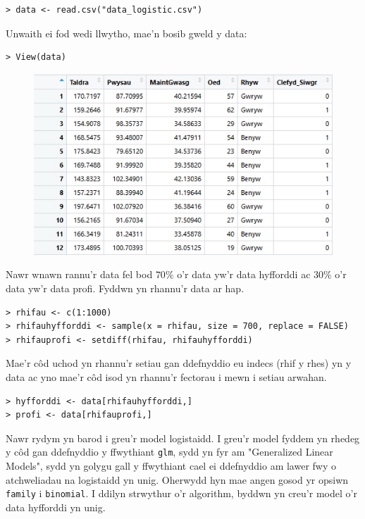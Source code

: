 \begin{verbatim}
> data <- read.csv("data_logistic.csv")
\end{verbatim}

Unwaith ei fod wedi llwytho, mae'n bosib gweld y data:

\begin{verbatim}
> View(data)
\end{verbatim}

\begin{figure}[H]
\begin{center}
\includegraphics[width=0.5\linewidth]{../img/data_diabetes_r.jpg}
\end{center}
\end{figure}

Nawr wnawn rannu'r data fel bod $70\%$ o'r data yw'r data hyfforddi ac $30\%$ o'r data yw'r data profi. Fyddwn yn rhannu'r data ar hap. 

\begin{verbatim}
> rhifau <- c(1:1000)
> rhifauhyfforddi <- sample(x = rhifau, size = 700, replace = FALSE)
> rhifauprofi <- setdiff(rhifau, rhifauhyfforddi)
\end{verbatim}

Mae'r c\^{o}d uchod yn rhannu'r setiau gan ddefnyddio eu indecs (rhif y rhes) yn y data ac yno mae'r c\^{o}d isod yn rhannu'r fectorau i mewn i setiau arwahan. 

\begin{verbatim}
> hyfforddi <- data[rhifauhyfforddi,] 
> profi <- data[rhifauprofi,]
\end{verbatim}

Nawr rydym yn barod i greu'r model logistaidd. I greu'r model fyddem yn rhedeg y c\^{o}d gan ddefnyddio y ffwythiant \texttt{glm}, sydd yn fyr am "Generalized Linear Models", sydd yn golygu gall y ffwythiant cael ei ddefnyddio am lawer fwy o atchweliadau na logistaidd yn unig. Oherwydd hyn mae angen gosod yr opsiwn \texttt{family} i \texttt{binomial}. I ddilyn strwythur o'r algorithm, byddwn yn creu'r model o'r data hyfforddi yn unig. 

